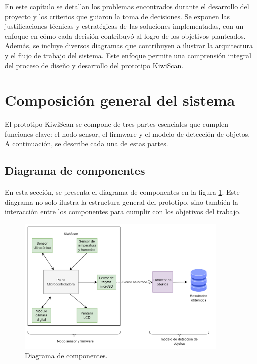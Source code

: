 
En este capítulo se detallan los problemas encontrados durante el desarrollo del proyecto y los criterios que guiaron la toma de decisiones. Se exponen las justificaciones técnicas y estratégicas de las soluciones implementadas, con un enfoque en cómo cada decisión contribuyó al logro de los objetivos planteados. Además, se incluye diversos diagramas que contribuyen a ilustrar la arquitectura y el flujo de trabajo del sistema. Este enfoque permite una comprensión integral del proceso de diseño y desarrollo del prototipo KiwiScan.

\section{Composición general del sistema}

El prototipo KiwiScan se compone de tres partes esenciales que cumplen funciones clave: el nodo sensor, el firmware y el modelo de detección de objetos. A continuación, se describe cada una de estas partes.

\subsection{Diagrama de componentes}

En esta sección, se presenta el diagrama de componentes en la figura \ref{fig:diagrama_de_componentes}. Este diagrama no solo ilustra la estructura general del prototipo, sino también la interacción entre los componentes para cumplir con los objetivos del trabajo.

\newpage

\vspace{1cm}

\begin{figure}[htbp]
	\centering
	\includegraphics[width=0.9\textwidth, height=0.45\textheight]{./Figures/diagrama_de_componentes.png}
	\caption{Diagrama de componentes.}
	\label{fig:diagrama_de_componentes}
\end{figure}

